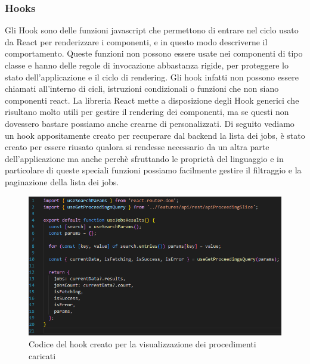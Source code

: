 \subsubsection{Hooks}
Gli Hook sono delle funzioni javascript che permettono di entrare nel ciclo usato da React per renderizzare i componenti, e in questo modo descriverne il comportamento.
Queste funzioni non possono essere usate nei componenti di tipo classe e hanno delle regole di invocazione abbastanza rigide, per proteggere lo stato dell'applicazione e il
ciclo di rendering. Gli hook infatti non possono essere chiamati all'interno di cicli, istruzioni condizionali o funzioni che non siano componenti react. La libreria React mette
a disposizione degli Hook generici che risultano molto utili per gestire il rendering dei componenti, ma se questi non dovessero bastare possiamo anche crearne di personalizzati.
Di seguito vediamo un hook appositamente creato per recuperare dal backend la lista dei jobs, è stato creato per essere riusato qualora si rendesse necessario da un altra parte
dell'applicazione ma anche perchè sfruttando le proprietà del linguaggio e in particolare di queste speciali funzioni possiamo facilmente gestire il filtraggio e la
paginazione della lista dei jobs.

\begin{figure}[H]
  \centering
  \includegraphics[width=\textwidth]{immagini/useJobResult-hook.png}
  \caption{Codice del hook creato per la visualizzazione dei procedimenti caricati}
\end{figure}


